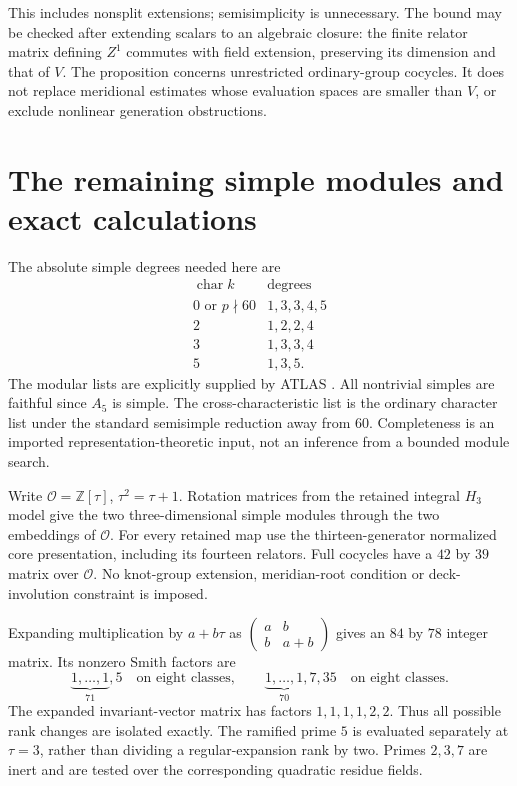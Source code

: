 \documentclass[11pt]{article}
\newcommand{\Z}{\mathbb Z}
\begin{document}
This includes nonsplit extensions; semisimplicity is unnecessary.
The bound may be checked after extending scalars to an algebraic
closure: the finite relator matrix defining $Z^1$ commutes with
field extension, preserving its dimension and that of $V$.
The proposition concerns unrestricted ordinary-group cocycles.
It does not replace meridional estimates whose evaluation spaces
are smaller than $V$, or exclude nonlinear generation obstructions.

\section{The remaining simple modules and exact calculations}

The absolute simple degrees needed here are
\[
\begin{array}{c|l}
 \operatorname{char}k&\text{degrees}\\\hline
 0\text{ or }p\nmid60&1,3,3,4,5\\
 2&1,2,2,4\\
 3&1,3,3,4\\
 5&1,3,5.
\end{array}
\]
The modular lists are explicitly supplied by ATLAS \cite{atlas}.
All nontrivial simples are faithful since $A_5$ is simple.
The cross-characteristic list is the ordinary character list under
the standard semisimple reduction away from $60$. Completeness is
an imported representation-theoretic input, not an inference from
a bounded module search.

Write $\mathcal O=\Z[\tau]$, $\tau^2=\tau+1$. Rotation matrices
from the retained integral $H_3$ model give the two three-dimensional
simple modules through the two embeddings of $\mathcal O$.
For every retained map use the thirteen-generator normalized
core presentation, including its fourteen relators. Full cocycles
have a $42$ by $39$ matrix over $\mathcal O$. No knot-group extension,
meridian-root condition or deck-involution constraint is imposed.

Expanding multiplication by $a+b\tau$ as
$\left(\begin{smallmatrix}a&b\\b&a+b\end{smallmatrix}\right)$ gives
an $84$ by $78$ integer matrix. Its nonzero Smith factors are
\[
 \underbrace{1,\ldots,1}_{71},5
 \quad\text{on eight classes},\qquad
 \underbrace{1,\ldots,1}_{70},7,35
 \quad\text{on eight classes}.
\]
The expanded invariant-vector matrix has factors $1,1,1,1,2,2$.
Thus all possible rank changes are isolated exactly. The ramified
prime $5$ is evaluated separately at $\tau=3$, rather than dividing
a regular-expansion rank by two. Primes $2,3,7$ are inert and are
tested over the corresponding quadratic residue fields.
\end{document}
